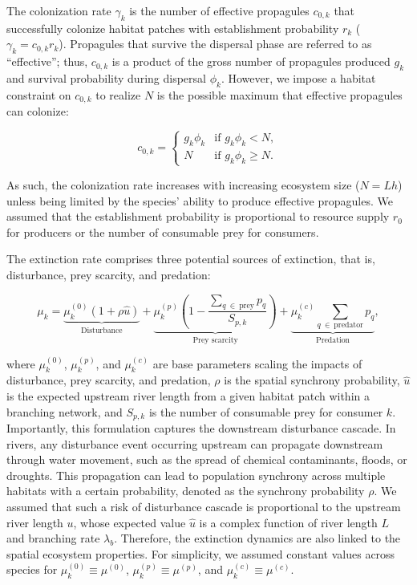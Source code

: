 \documentclass[11pt, class=article, crop=false]{standalone}
\begin{document}
The colonization rate $\gamma_k$ is the number of effective propagules $c_{0,k}$ that successfully colonize habitat patches with establishment probability $r_k$ ($\gamma_k = c_{0,k} r_k$).
Propagules that survive the dispersal phase are referred to as ``effective''; thus, $c_{0,k}$ is a product of the gross number of propagules produced $g_k$ and survival probability during dispersal $\phi_k$.
However, we impose a habitat constraint on $c_{0,k}$ to realize $N$ is the possible maximum that effective propagules can colonize:

\begin{equation}
    c_{0, k} = 
    \begin{cases}
        g_k \phi_k & \text{if $g_k \phi_k < N$},\\
        N & \text{if $g_k \phi_k \ge N$}.
    \end{cases}
    \label{eq:c0-prod}
\end{equation}

As such, the colonization rate increases with increasing ecosystem size ($N = Lh$) unless being limited by the species' ability to produce effective propagules.
We assumed that the establishment probability is proportional to resource supply $r_0$ for producers or the number of consumable prey for consumers.

The extinction rate comprises three potential sources of extinction, that is, disturbance, prey scarcity, and predation:

\begin{equation}
    \mu_{k} = 
        \underbrace{\mu_{k}^{(0)} (1 + \rho \hat{u})}_{\text{Disturbance}} + 
        \underbrace{\mu_{k}^{(p)} \left(1 - \frac{\sum_{q~\in~\text{prey}} p_{q}}{S_{p, k}} \right)}_{\text{Prey scarcity}} + 
        \underbrace{\mu_{k}^{(c)} \sum_{q~\in~\text{predator}} p_{q}}_{\text{Predation}},
    \label{eq:extn}    
\end{equation}

where $\mu_k^{(0)}$, $\mu_k^{(p)}$, and $\mu_k^{(c)}$ are base parameters scaling the impacts of disturbance, prey scarcity, and predation, $\rho$ is the spatial synchrony probability, $\hat{u}$ is the expected upstream river length from a given habitat patch within a branching network, and $S_{p, k}$ is the number of consumable prey for consumer $k$.
Importantly, this formulation captures the downstream disturbance cascade.
In rivers, any disturbance event occurring upstream can propagate downstream through water movement, such as the spread of chemical contaminants, floods, or droughts.
This propagation can lead to population synchrony across multiple habitats with a certain probability, denoted as the synchrony probability $\rho$. 
We assumed that such a risk of disturbance cascade is proportional to the upstream river length $u$, whose expected value $\hat{u}$ is a complex function of river length $L$ and branching rate $\lambda_b$.
Therefore, the extinction dynamics are also linked to the spatial ecosystem properties.
For simplicity, we assumed constant values across species for $\mu_k^{(0)} \equiv \mu^{(0)}$, $\mu_k^{(p)} \equiv \mu^{(p)}$, and $\mu_k^{(c)} \equiv \mu^{(c)}$.
\end{document}
